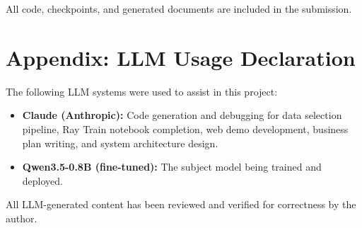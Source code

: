 \documentclass[12pt,a4paper]{article}
\begin{document}
All code, checkpoints, and generated documents are included in the submission.

\section*{Appendix: LLM Usage Declaration}

The following LLM systems were used to assist in this project:

\begin{itemize}[leftmargin=*]
    \item \textbf{Claude (Anthropic):} Code generation and debugging for data selection pipeline, Ray Train notebook completion, web demo development, business plan writing, and system architecture design.
    \item \textbf{Qwen3.5-0.8B (fine-tuned):} The subject model being trained and deployed.
\end{itemize}

All LLM-generated content has been reviewed and verified for correctness by the author.
\end{document}
